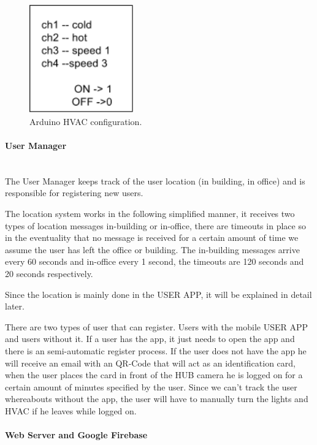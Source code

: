 \begin{figure}[h]
\centering
\includegraphics[width=0.4\textwidth]{Figures/temperature_post_imp}
\caption{Arduino HVAC configuration.}
\label{arduino_post_imp}
\end{figure}


\paragraph{User Manager}\mbox{}\\


The User Manager keeps track of the user location (in building, in office) and is responsible for registering new users.

The location system works in the following simplified manner, it receives two types of location messages in-building or in-office, there are timeouts in place so in the eventuality that no message is received for a certain amount of time we assume the user has left the office or building. The in-building messages arrive every 60 seconds and in-office every 1 second, the timeouts are 120 seconds and 20 seconds respectively.

Since the location is mainly done in the USER APP, it will be explained in detail later.


There are two types of user that can register. Users with the mobile USER APP and users without it. If a user has the app, it just needs to open the app and there is an semi-automatic register process. If the user does not have the app he will receive an email with an QR-Code that will act as an identification card, when the user places the card in front of the HUB camera he is logged on for a certain amount of minutes specified by the user. Since we can't track the user whereabouts without the app, the user will have to manually turn the lights and \ac{HVAC} if he leaves while logged on.



\paragraph{Web Server and Google Firebase}\mbox{}\\


